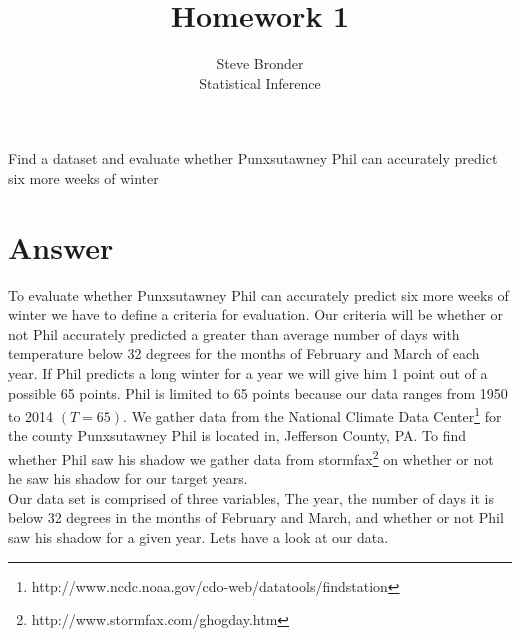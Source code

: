 \documentclass[12pt]{article}\usepackage[]{graphicx}\usepackage[]{color}
\newenvironment{exercise}[2][Exercise]{\begin{trivlist}
\item[\hskip \labelsep {\bfseries #1}\hskip \labelsep {\bfseries #2.}]}{\end{trivlist}}
\begin{document}
 
 
\title{Homework 1}%
\author{Steve Bronder\\ %
Statistical Inference} %
 
\maketitle
 
\begin{exercise}{1}Find a dataset and evaluate whether Punxsutawney Phil can accurately predict six more weeks of winter
\end{exercise}

\section*{Answer}
 To evaluate whether Punxsutawney Phil can accurately predict six more weeks of winter we have to define a criteria for evaluation. Our criteria will be whether or not Phil accurately predicted a greater than average number of days with temperature below 32 degrees for the months of February and March of each year. If Phil predicts a long winter for a year we will give him 1 point out of a possible 65 points. Phil is limited to 65 points because our data ranges from 1950 to 2014 $(T=65)$. We gather data from the National Climate Data Center\footnote{http://www.ncdc.noaa.gov/cdo-web/datatools/findstation} for the county Punxsutawney Phil is located in, Jefferson County, PA. To find whether Phil saw his shadow we gather data from stormfax\footnote{http://www.stormfax.com/ghogday.htm} on whether or not he saw his shadow for our target years. \\

 Our data set is comprised of three variables, The year, the number of days it is below 32 degrees in the months of February and March, and whether or not Phil saw his shadow for a given year. Lets have a look at our data.
 
\end{document}
